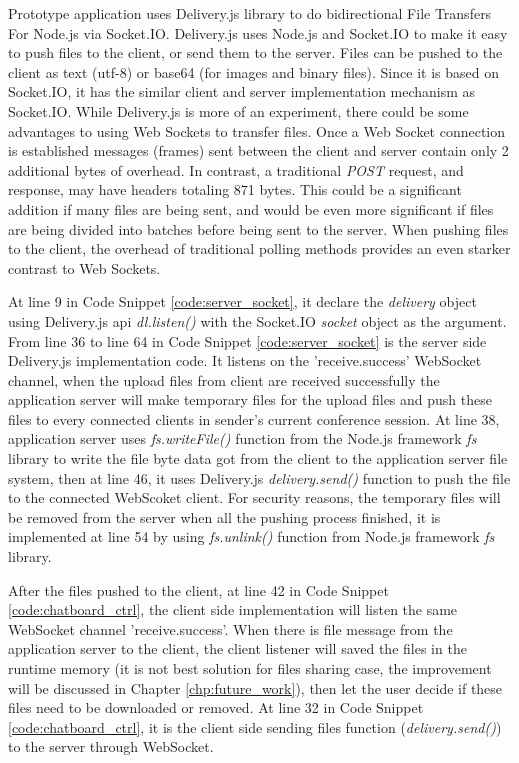 \par Prototype application uses Delivery.js library to do bidirectional File Transfers For Node.js via Socket.IO. Delivery.js uses Node.js and Socket.IO to make it easy to push files to the client, or send them to the server. Files can be pushed to the client as text (utf-8) or base64 (for images and binary files).\cite{github:deliveryjs} Since it is based on Socket.IO, it has the similar client and server implementation mechanism as Socket.IO. While Delivery.js is more of an experiment, there could be some advantages to using Web Sockets to transfer files. Once a Web Socket connection is established messages (frames) sent between the client and server contain only 2 additional bytes of overhead. In contrast, a traditional \textit{POST} request, and response, may have headers totaling 871 bytes. This could be a significant addition if many files are being sent, and would be even more significant if files are being divided into batches before being sent to the server. When pushing files to the client, the overhead of traditional polling methods provides an even starker contrast to Web Sockets.

\par At line 9 in Code Snippet \ref{code:server_socket}, it declare the \textit{delivery} object using Delivery.js \gls{api} \textit{dl.listen()} with the Socket.IO \textit{socket} object as the argument. From line 36 to line 64 in Code Snippet \ref{code:server_socket} is the server side Delivery.js implementation code. It listens on the 'receive.success' WebSocket channel, when the upload files from client are received successfully the application server will make temporary files for the upload files and push these files to every connected clients in sender's current conference session. At line 38, application server uses \textit{fs.writeFile()} function from the Node.js framework \textit{fs} library to write the file byte data got from the client to the application server file system, then at line 46, it uses Delivery.js \textit{delivery.send()} function to push the file to the connected WebScoket client. For security reasons, the temporary files will be removed from the server when all the pushing process finished, it is implemented at line 54 by using \textit{fs.unlink()} function from Node.js framework \textit{fs} library.

\par After the files pushed to the client, at line 42 in Code Snippet \ref{code:chatboard_ctrl}, the client side implementation will listen the same WebSocket channel 'receive.success'. When there is file message from the application server to the client, the client listener will saved the files in the runtime memory (it is not best solution for files sharing case, the improvement will be discussed in Chapter \ref{chp:future_work}), then let the user decide if these files need to be downloaded or removed. At line 32 in Code Snippet \ref{code:chatboard_ctrl}, it is the client side sending files function (\textit{delivery.send()}) to the server through WebSocket.

